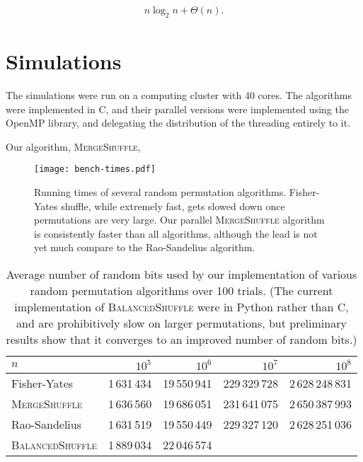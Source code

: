 \documentclass[letter,11pt,en]{quick-document}
\begin{document}
\begin{align*}
n \log_2 n + \Theta (n).
\end{align*}

\section{Simulations}

The simulations were run on a computing cluster with 40 cores. The
algorithms were implemented in C, and their parallel versions were
implemented using the OpenMP library, and delegating the distribution of
the threading entirely to it. 

Our algorithm, \textsc{MergeShuffle}, 

\begin{figure}[H]
\begin{center}
\texttt{[image: bench-times.pdf]}
\end{center}
\caption{Running times of several random permutation algorithms.
  Fisher-Yates shuffle, while extremely fast, gets slowed down once
  permutations are very large. Our parallel \textsc{MergeShuffle}
  algorithm is consistently faster than all algorithms, although the lead
  is not yet much compare to the Rao-Sandelius algorithm.}
\end{figure}


\begin{table}[t]
\begin{center}
\begin{tabular}{lrrrr}
  \toprule
  $n$	        &$10^5$	        &$10^6$	        &$10^7$	        &$10^8$\\\midrule
  Fisher-Yates	&1\,631\,434	&19\,550\,941	&229\,329\,728	&2\,628\,248\,831\\
  \textsc{MergeShuffle}	&1\,636\,560	&19\,686\,051	&231\,641\,075	&2\,650\,387\,993\\
  Rao-Sandelius	        &1\,631\,519	&19\,550\,449	&229\,327\,120	&2\,628\,251\,036\\
  \textsc{BalancedShuffle}	&1\,889\,034	&22\,046\,574	&	        &\\
  \bottomrule
\end{tabular}
\end{center}
\caption{Average number of random bits used by our implementation of various
  random permutation algorithms over 100 trials. (The current implementation of
  \textsc{BalancedShuffle} were in Python rather than C, and are prohibitively
  slow on larger permutations, but preliminary results show that it converges
  to an improved number of random bits.) }
\end{table}
\end{document}

